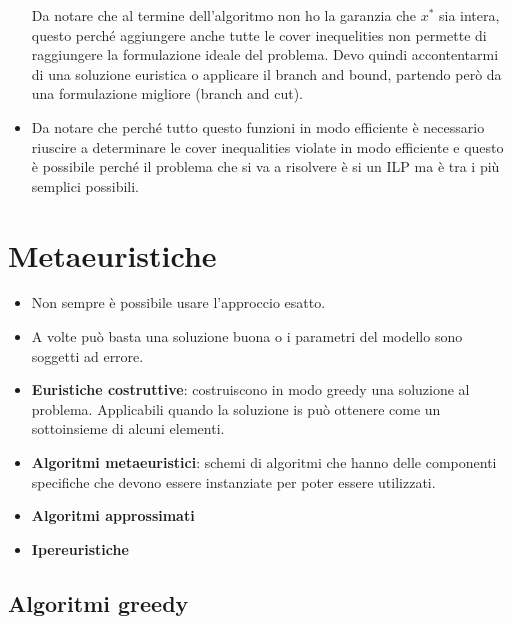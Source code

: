 \begin{itemize}
\begin{enumerate}
	\end{enumerate}
	Da notare che al termine dell'algoritmo non ho la garanzia che $x^*$ sia intera, questo perché aggiungere anche tutte le cover inequelities non permette di raggiungere la formulazione ideale del problema. Devo quindi accontentarmi di una soluzione euristica o applicare il branch and bound, partendo però da una formulazione migliore (branch and cut).
	\item Da notare che perché tutto questo funzioni in modo efficiente è necessario riuscire a determinare le cover inequalities violate in modo efficiente e questo è possibile perché il problema che si va a risolvere è si un ILP ma è tra i più semplici possibili.
\end{itemize}

\section{Metaeuristiche}

\begin{itemize}
	\item Non sempre è possibile usare l'approccio esatto.
	\item A volte può basta una soluzione buona o i parametri del modello sono soggetti ad errore.
	\item \textbf{Euristiche costruttive}: costruiscono in modo greedy una soluzione al problema. Applicabili quando la soluzione is può ottenere come un sottoinsieme di alcuni elementi.
	\item \textbf{Algoritmi metaeuristici}: schemi di algoritmi che hanno delle componenti specifiche che devono essere instanziate per poter essere utilizzati.
	\item \textbf{Algoritmi approssimati}
	\item \textbf{Ipereuristiche}
\end{itemize}

\subsection{Algoritmi greedy}

